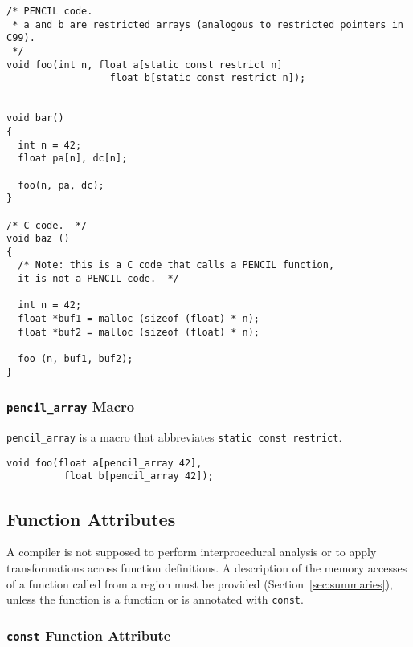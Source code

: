 \begin{lstlisting}[language=pencil]
/* PENCIL code.
 * a and b are restricted arrays (analogous to restricted pointers in C99).
 */
void foo(int n, float a[static const restrict n]
                  float b[static const restrict n]);


void bar()
{
  int n = 42;
  float pa[n], dc[n];

  foo(n, pa, dc);
}

/* C code.  */
void baz ()
{
  /* Note: this is a C code that calls a PENCIL function,
  it is not a PENCIL code.  */

  int n = 42;
  float *buf1 = malloc (sizeof (float) * n);
  float *buf2 = malloc (sizeof (float) * n);

  foo (n, buf1, buf2);
}
\end{lstlisting}


\subsubsection{\texttt{pencil\_array} Macro}

\lstinline!pencil_array! is a macro that abbreviates
  \lstinline!static const restrict!.

  \begin{lstlisting}[language=pencil]
void foo(float a[pencil_array 42],
          float b[pencil_array 42]);
  \end{lstlisting}

\subsection{Function Attributes}

A \pencil compiler is not supposed to perform interprocedural analysis or to
apply transformations across function definitions.
A description of the memory accesses of a function called from a \pencil
region must be provided (Section~\ref{sec:summaries}),
unless the function is a \pencil function
or is annotated with \lstinline!const!.

\subsubsection{\texttt{const} Function Attribute}
\label{sec:const-attribute}


